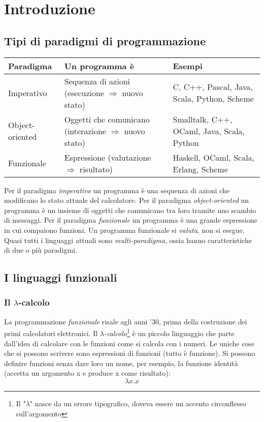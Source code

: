 \chapter{Introduzione}

\section{Tipi di paradigmi di programmazione}

\begin{center}
    \begin{tabular}{ | l | p{7cm} | p{5cm} |}
    \hline
    \textbf{Paradigma}      
& \textbf{Un programma è}
& \textbf{Esempi} \\ \hline\hline
Imperativo
& Sequenza di azioni (esecuzione $\Rightarrow$ nuovo stato)
& C, C++, Pascal, Java, Scala, Python, Scheme\\ \hline
Object-oriented
& Oggetti che comunicano (interazione $\Rightarrow$ nuovo stato)
& Smalltalk, C++, OCaml, Java, Scala, Python \\ \hline
Funzionale
& Espressione (valutazione $\Rightarrow$ risultato)
& Haskell, OCaml, Scala, Erlang, Scheme \\
    \hline
    \end{tabular}
\end{center}

\noindent Per il paradigma \textit{imperativo} un programma è una sequenza di azioni che modificano lo stato attuale del calcolatore. Per il paradigma \textit{object-oriented} un programma è un insieme di oggetti che comunicano tra loro tramite uno scambio di messaggi. Per il paradigma \textit{funzionale} un programma è una grande espressione in cui compaiono funzioni. Un programma funzionale si \textit{valuta}, non si esegue.
Quasi tutti i linguaggi attuali sono \textit{multi-paradigma}, ossia hanno caratteristiche di due o più paradigmi.

\section{I linguaggi funzionali}

\subsection{Il \texorpdfstring{$\mathcal{\lambda}$}--calcolo}

La programmazione \textit{funzionale} risale agli anni '30, prima della costruzione dei primi calcolatori elettronici. Il \textit{$\lambda$-calcolo}\footnote{Il "$\lambda$" nasce da un errore tipografico, doveva essere un accento circonflesso sull'argomento} è un piccolo linguaggio che parte dall'idea di calcolare con le funzioni come si calcola con i numeri. Le uniche cose che si possono scrivere sono espressioni di funzioni (tutto è funzione). Si possono definire funzioni senza dare loro un nome, per esempio, la funzione identità (accetta un argomento x e produce x come risultato): $$\lambda x.x$$

